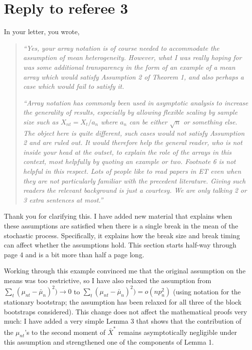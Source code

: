 \documentclass[12pt]{article}
\begin{document}
\section*{\hfill Reply to referee 3\hfill}

In your letter, you wrote,
\begin{quotation}
  \noindent\textit{``Yes, your array notation is of course needed to
    accommodate the assumption of mean heterogeneity. However, what I
    was really hoping for was some additional transparency in the form
    of an example of a mean array which would satisfy Assumption 2 of
    Theorem 1, and also perhaps a case which would fail to satisfy
    it.}

  \textit{``Array notation has commonly been used in asymptotic
    analysis to increase the generality of results, especially by
    allowing flexible scaling by sample size such as
    $X_{nt} = X_t/a_n$ where $a_n$ can be either $\sqrt{n}$ or
    something else. The object here is quite different, such cases
    would not satisfy Assumption 2 and are ruled out. It would
    therefore help the general reader, who is not inside your head at
    the outset, to explain the role of the arrays in this context,
    most helpfully by quoting an example or two. Footnote 6 is not
    helpful in this respect. Lots of people like to read papers in ET
    even when they are not particularly familiar with the precedent
    literature. Giving such readers the relevant background is just a
    courtesy. We are only talking 2 or 3 extra sentences at most.''}
\end{quotation}

Thank you for clarifying this. I have added new material that explains
when these assumptions are satisfied when there is a single break in
the mean of the stochastic process. Specifically, it explains how the
break size and break timing can affect whether the assumptions
hold. This section starts half-way through page 4 and is a bit more
than half a page long.

Working through this example convinced me that the original assumption
on the means was too restrictive, so I have also relaxed the
assumption from $\sum_t (\mu_{nt} - \bar \mu_n)^2) \to 0$ to
$\sum_t (\mu_{nt} - \bar \mu_n)^2) = o(n p_n^2)$ (using notation for
the stationary bootstrap; the assumption has been relaxed for all
three of the block bootstraps considered).  This change does not
affect the mathematical proofs very much: I have added a very simple
Lemma 3 that shows that the contribution of the $\mu_{nt}$'s to the
second moment of $\bar X^*$ remains asymptotically negligible under
this assumption and strengthened one of the components of Lemma 1.
\end{document}
